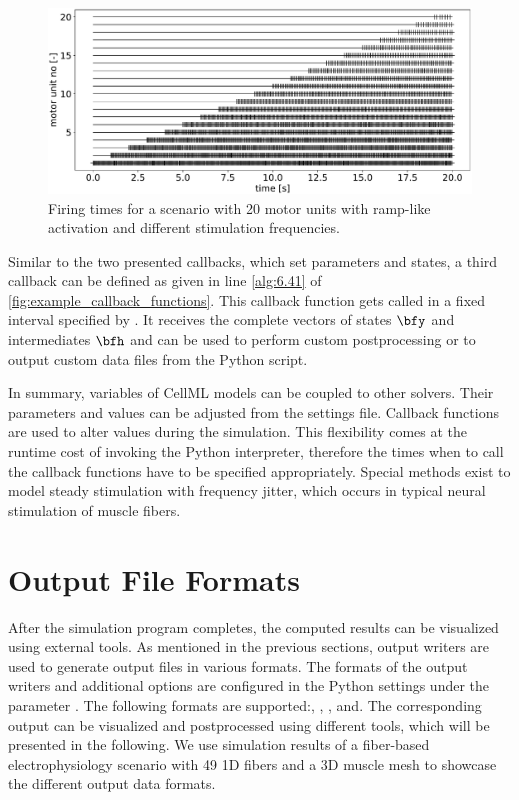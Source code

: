 \begin{figure}%
  \centering%
  \includegraphics[width=\textwidth]{images/implementation/firing_times_ramp1.pdf}%
  \caption{Firing times for a scenario with 20 motor units with ramp-like activation and different stimulation frequencies.}%
  \label{fig:firing_times_ramp}%
\end{figure}%

Similar to the two presented callbacks, which set parameters and states, a third callback  can be defined as given in line \ref{alg:6.41} of \cref{fig:example_callback_functions}. This callback function gets called in a fixed interval specified by . It receives the complete vectors of states $\bfy$ and intermediates $\bfh$ and can be used to perform custom postprocessing or to output custom data files from the Python script.

In summary, variables of CellML models can be coupled to other solvers. Their parameters and values can be adjusted from the settings file. Callback functions are used to alter values during the simulation. This flexibility comes at the runtime cost of invoking the Python interpreter, therefore the times when to call the callback functions have to be specified appropriately. Special methods exist to model steady stimulation with frequency jitter, which occurs in typical neural stimulation of muscle fibers.

\section{Output File Formats}\label{sec:output_file_formats}

After the simulation program completes, the computed results can be visualized using external tools.
As mentioned in the previous sections, output writers are used to generate output files in various formats. The formats of the output writers and additional options are configured in the Python settings under the parameter . The following formats are supported:, , ,  and\break{}.
The corresponding output can be visualized and postprocessed using different tools, which will be presented in the following. We use simulation results of a fiber-based electrophysiology scenario with 49 1D fibers and a 3D muscle mesh to showcase the different output data formats.

